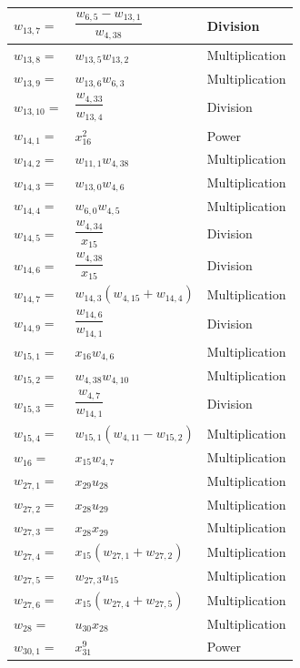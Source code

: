 \begin{longtable}{|p{1.5cm}|l|p{2cm}|}
$w_{13,7}=$ & $ \dfrac{w_{6,5}-w_{13,1}}{w_{4,38}} $ & Division \\ \hline
$w_{13,8}=$ & $ w_{13,5}w_{13,2} $ & Multiplication \\ \hline
$w_{13,9}=$ & $ w_{13,6}w_{6,3} $ & Multiplication \\ \hline
$w_{13,10}=$ & $ \dfrac{w_{4,33}}{w_{13,4}} $ & Division \\ \hline
$w_{14,1}=$ & $ x_{16}^{2} $ & Power \\ \hline
$w_{14,2}=$ & $ w_{11,1}w_{4,38} $ & Multiplication \\ \hline
$w_{14,3}=$ & $ w_{13,0}w_{4,6} $ & Multiplication \\ \hline
$w_{14,4}=$ & $ w_{6,0}w_{4,5} $ & Multiplication \\ \hline
$w_{14,5}=$ & $ \dfrac{w_{4,34}}{x_{15}} $ & Division \\ \hline
$w_{14,6}=$ & $ \dfrac{w_{4,38}}{x_{15}} $ & Division \\ \hline
$w_{14,7}=$ & $ w_{14,3}\left(w_{4,15}+w_{14,4}\right) $ & Multiplication \\ \hline
$w_{14,9}=$ & $ \dfrac{w_{14,6}}{w_{14,1}} $ & Division \\ \hline
$w_{15,1}=$ & $ x_{16}w_{4,6} $ & Multiplication \\ \hline
$w_{15,2}=$ & $ w_{4,38}w_{4,10} $ & Multiplication \\ \hline
$w_{15,3}=$ & $ \dfrac{w_{4,7}}{w_{14,1}} $ & Division \\ \hline
$w_{15,4}=$ & $ w_{15,1}\left(w_{4,11}-w_{15,2}\right) $ & Multiplication \\ \hline
$w_{16}=$ & $ x_{15}w_{4,7} $ & Multiplication  \\ \hline
$w_{27,1}=$ & $ x_{29}u_{28} $ & Multiplication \\ \hline
$w_{27,2}=$ & $ x_{28}u_{29} $ & Multiplication \\ \hline
$w_{27,3}=$ & $ x_{28}x_{29} $ & Multiplication \\ \hline
$w_{27,4}=$ & $ x_{15}\left(w_{27,1}+w_{27,2}\right) $ & Multiplication \\ \hline
$w_{27,5}=$ & $ w_{27,3}u_{15} $ & Multiplication \\ \hline
$w_{27,6}=$ & $ x_{15}\left(w_{27,4}+w_{27,5}\right) $ & Multiplication \\ \hline 
$w_{28}=$ & $ u_{30}x_{28} $ & Multiplication \\ \hline
$w_{30,1}=$ & $ x_{31}^{9} $ & Power \\ \hline

\end{longtable}

